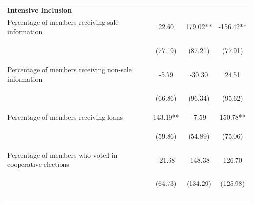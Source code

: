 \documentclass[11pt]{article}
\begin{document}
\begin{table}[H]
{\begin{tabularx}{1.1\linewidth}{lccc}
 \textbf{Intensive Inclusion} & & & \\
\noalign{\smallskip}Percentage of members receiving sale information & 22.60 & 179.02** & -156.42**\\
 & \begin{footnotesize}(77.19)\end{footnotesize} & \begin{footnotesize}(87.21)\end{footnotesize} & \begin{footnotesize}(77.91)\end{footnotesize}\\
\noalign{\smallskip}Percentage of members receiving non-sale information & -5.79 & -30.30 & 24.51\\
 & \begin{footnotesize}(66.86)\end{footnotesize} & \begin{footnotesize}(96.34)\end{footnotesize} & \begin{footnotesize}(95.62)\end{footnotesize}\\
\noalign{\smallskip}Percentage of members receiving loans & 143.19** & -7.59 & 150.78**\\
 & \begin{footnotesize}(59.86)\end{footnotesize} & \begin{footnotesize}(54.89)\end{footnotesize} & \begin{footnotesize}(75.06)\end{footnotesize}\\
\noalign{\smallskip}Percentage of members who voted in cooperative elections & -21.68 & -148.38 & 126.70\\
 & \begin{footnotesize}(64.73)\end{footnotesize} & \begin{footnotesize}(134.29)\end{footnotesize} & \begin{footnotesize}(125.98)\end{footnotesize}\\
\noalign{\smallskip}\hline
  \end{tabularx}}
\end{table}
\doublespacing
\end{document}
